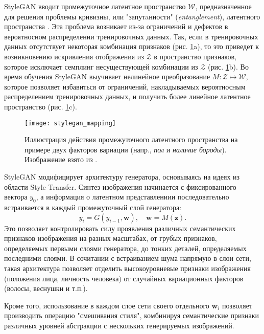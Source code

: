 StyleGAN вводит промежуточное латентное пространство $\mathcal W$, предназначенное для решения проблемы кривизны, или "запутaнности" \linebreak (\emph{entanglement}), латентного пространства \cite{arvanitidis2018oddity}. 
Эта проблема возникает из-за ограничений и дефектов в вероятносном распределении тренировочных данных.
Так, если в тренировочных данных отсутствует некоторая комбинация признаков (рис. \ref{fig:stylegan-mapping}a), то это приведет к возникновению искривления отображения из $\mathcal Z$ в пространство признаков, которое исключает семплинг несуществующей комбинации из $\mathcal Z$ (рис. \ref{fig:stylegan-mapping}b). 
Во время обучения StyleGAN выучивает нелинейное преобразование $M: \mathcal Z \mapsto \mathcal W$, которое позволяет избавиться от ограничений, накладываемых вероятносным распределением тренировочных данных, и получить более линейное латентное пространство  (рис. \ref{fig:stylegan-mapping}c).

\begin{figure}[h]
\begin{center}
    \texttt{[image: stylegan\_mapping]}
    \caption{Иллюстрация действия промежуточного латентного пространства на примере двух факторов вариации (напр., \emph{пол} и \emph{наличие бороды}). Изображение взято из \cite{StyleGAN}.}
    \label{fig:stylegan-mapping}
\end{center}
\end{figure}

StyleGAN модифицирует архитектуру генератора, основываясь на идеях из области Style Transfer. 
Синтез изображения начинается с фиксированного вектора $y_0$, а информация о латентном представлениии последовательно встраивается в каждый промежуточный слой генератора:
$$ y_i = G(y_{i-1}, \mathbf w),\quad \mathbf w = M(\mathbf z). $$
Это позволяет контролировать силу проявления различных семантических признаков изображения на разных масштабах, от грубых признаков, определяемых первыми слоями генератора, до тонких деталей, определяемых последними слоями.
В сочитании с встраиванием шума напрямую в слои сети, такая архитектура позволяет отделить высокоуровневые признаки изображения (положения лица, личность человека) от случайных вариационных факторов (волосы, веснушки и т.п.).

Кроме того, использование в каждом слое сети своего отдельного $\mathbf w_i$ позволяет производить операцию "смешивания стиля", комбинируя семантические признаки различных уровней абстракции с нескольких генерируемых изображений.

